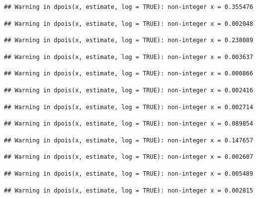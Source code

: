 \documentclass[]{article}
\begin{document}
\begin{verbatim}
## Warning in dpois(x, estimate, log = TRUE): non-integer x = 0.355476
\end{verbatim}

\begin{verbatim}
## Warning in dpois(x, estimate, log = TRUE): non-integer x = 0.002048
\end{verbatim}

\begin{verbatim}
## Warning in dpois(x, estimate, log = TRUE): non-integer x = 0.238089
\end{verbatim}

\begin{verbatim}
## Warning in dpois(x, estimate, log = TRUE): non-integer x = 0.003637
\end{verbatim}

\begin{verbatim}
## Warning in dpois(x, estimate, log = TRUE): non-integer x = 0.000866
\end{verbatim}

\begin{verbatim}
## Warning in dpois(x, estimate, log = TRUE): non-integer x = 0.002416
\end{verbatim}

\begin{verbatim}
## Warning in dpois(x, estimate, log = TRUE): non-integer x = 0.002714
\end{verbatim}

\begin{verbatim}
## Warning in dpois(x, estimate, log = TRUE): non-integer x = 0.089854
\end{verbatim}

\begin{verbatim}
## Warning in dpois(x, estimate, log = TRUE): non-integer x = 0.147657
\end{verbatim}

\begin{verbatim}
## Warning in dpois(x, estimate, log = TRUE): non-integer x = 0.002607
\end{verbatim}

\begin{verbatim}
## Warning in dpois(x, estimate, log = TRUE): non-integer x = 0.005489
\end{verbatim}

\begin{verbatim}
## Warning in dpois(x, estimate, log = TRUE): non-integer x = 0.002815
\end{verbatim}
\end{document}
